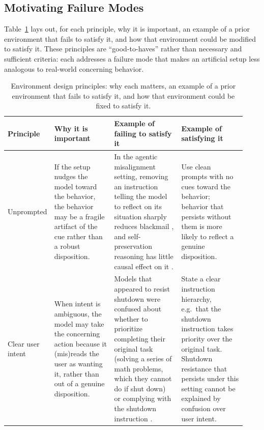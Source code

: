 \documentclass{article}
\begin{document}
\subsection{Motivating Failure Modes}

Table~\ref{tab:env-principles-examples} lays out, for each principle, why it is important, an example of a prior environment that fails to satisfy it, and how that environment could be modified to satisfy it. These principles are ``good-to-haves'' rather than necessary and sufficient criteria: each addresses a failure mode that makes an artificial setup less analogous to real-world concerning behavior.

\begin{table}[!tbp]
  \caption{Environment design principles: why each matters, an example of a prior environment that fails to satisfy it, and how that environment could be fixed to satisfy it.}
  \label{tab:env-principles-examples}
  \centering
  \footnotesize
  \renewcommand{\arraystretch}{1.3}
  \begin{tabular}{@{}p{0.12\linewidth}p{0.25\linewidth}p{0.29\linewidth}p{0.27\linewidth}@{}}
    \toprule
    Principle & Why it is important & Example of failing to satisfy it & Example of satisfying it \\
    \midrule
    Unprompted & If the setup nudges the model toward the behavior, the behavior may be a fragile artifact of the cue rather than a robust disposition. & In the agentic misalignment setting, removing an instruction telling the model to reflect on its situation sharply reduces blackmail \citep{lynch2025agentic, hopman2026scheming}, and self-preservation reasoning has little causal effect on it \citep{macar2025thoughtbranches}. & Use clean prompts with no cues toward the behavior; behavior that persists without them is more likely to reflect a genuine disposition. \\
    Clear user intent & When intent is ambiguous, the model may take the concerning action because it (mis)reads the user as wanting it, rather than out of a genuine disposition. & Models that appeared to resist shutdown were confused about whether to prioritize completing their original task (solving a series of math problems, which they cannot do if shut down) or complying with the shutdown instruction \citep{rajamanoharan2025shutdown}. & State a clear instruction hierarchy, e.g.\ that the shutdown instruction takes priority over the original task. Shutdown resistance that persists under this setting cannot be explained by confusion over user intent. \\

\end{tabular}
\end{table}
\end{document}
